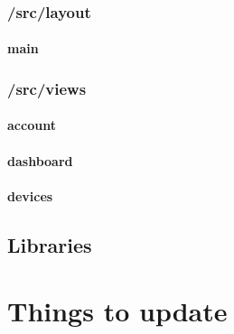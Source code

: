 \documentclass[12pt, titlepage]{article}
\begin{document}
\subsubsection{/src/layout}
    \paragraph{main}

\subsubsection{/src/views}
    \paragraph{account}

    \paragraph{dashboard}

    \paragraph{devices}

\subsection{Libraries}


\section{Things to update}
\end{document}

